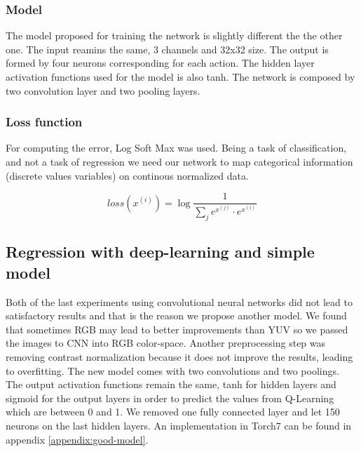 \subsubsection{Model}
The model proposed for training the network is slightly different the the other one. The input reamins the same, 3 channels and 32x32 size. The output is formed by four neurons corresponding for each action. The hidden layer activation functions used for the model is also tanh. The network is composed by two convolution layer and two pooling layers.

\subsubsection{Loss function}
For computing the error, Log Soft Max was used. Being a task of classification, and not a task of regression we need our network to map categorical information (discrete values variables) on continous normalized data.

\begin{equation}
loss(x^{(i)}) = \log {\frac{1}{\displaystyle\sum_{j} e^{x^{(j)}}\cdot e^{x^{(i)}}}}
\end{equation}

\subsection{Regression with deep-learning and simple model}

Both of the last experiments using convolutional neural networks did not lead to satisfactory results and that is the reason we propose another model. We found that sometimes RGB may lead to better improvements than YUV\cite{pipeline} so we passed the images to CNN into RGB color-space. Another preprocessing step was removing contrast normalization because it does not improve the results, leading to overfitting. The new model comes with two convolutions and two poolings. The output activation functions remain the same, tanh for hidden layers and sigmoid for the output layers in order to predict the values from Q-Learning which are between 0 and 1. We removed one fully connected layer and let 150 neurons on the last hidden layers. An implementation in Torch7 can be found in appendix \ref{appendix:good-model}.



